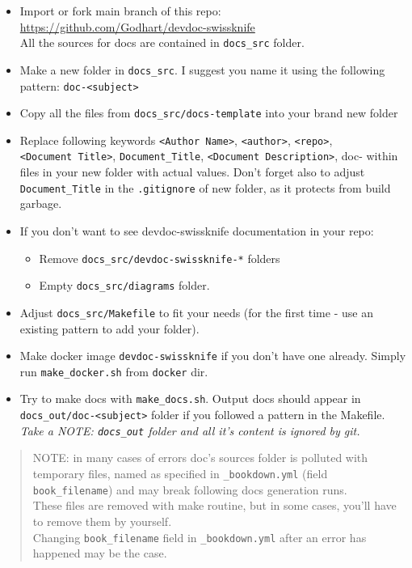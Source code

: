 \documentclass[12pt,a4paper,12pt,oneside,openany]{book}
\providecommand{\tightlist}{%
  \setlength{\itemsep}{0pt}\setlength{\parskip}{0pt}}
\begin{document}
\begin{itemize}
\item
  Import or fork main branch of this repo: \url{https://github.com/Godhart/devdoc-swissknife}\\
  All the sources for docs are contained in \texttt{docs\_src} folder.
\item
  Make a new folder in \texttt{docs\_src}. I suggest you name it using the following pattern: \texttt{doc-\textless{}subject\textgreater{}}
\item
  Copy all the files from \texttt{docs\_src/docs-template} into your brand new folder
\item
  Replace following keywords \texttt{\textless{}Author\ Name\textgreater{}}, \texttt{\textless{}author\textgreater{}}, \texttt{\textless{}repo\textgreater{}}, \texttt{\textless{}Document\ Title\textgreater{}}, \texttt{Document\_Title}, \texttt{\textless{}Document\ Description\textgreater{}}, doc- within files in your new folder with actual values. Don't forget also to adjust \texttt{Document\_Title} in the \texttt{.gitignore} of new folder, as it protects from build garbage.
\item
  If you don't want to see devdoc-swissknife documentation in your repo:

  \begin{itemize}
  \tightlist
  \item
    Remove \texttt{docs\_src/devdoc-swissknife-*} folders
  \item
    Empty \texttt{docs\_src/diagrams} folder.
  \end{itemize}
\item
  Adjust \texttt{docs\_src/Makefile} to fit your needs (for the first time - use an existing pattern to add your folder).
\item
  Make docker image \texttt{devdoc-swissknife} if you don't have one already. Simply run \texttt{make\_docker.sh} from \texttt{docker} dir.
\item
  Try to make docs with \texttt{make\_docs.sh}. Output docs should appear in \texttt{docs\_out/doc-\textless{}subject\textgreater{}} folder if you followed a pattern in the Makefile.\\
  \emph{Take a NOTE: \texttt{docs\_out} folder and all it's content is ignored by git.}
\end{itemize}

\begin{quote}
NOTE: in many cases of errors doc's sources folder is polluted with temporary files, named as specified in \texttt{\_bookdown.yml} (field \texttt{book\_filename}) and may break following docs generation runs.\\
These files are removed with make routine, but in some cases, you'll have to remove them by yourself.\\
Changing \texttt{book\_filename} field in \texttt{\_bookdown.yml} after an error has happened may be the case.
\end{quote}
\end{document}
